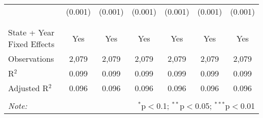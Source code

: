 \begin{table}[!htbp]
\begin{tabular}{@{\extracolsep{5pt}}lcccccc}
  & (0.001) & (0.001) & (0.001) & (0.001) & (0.001) & (0.001) \\ 
  & & & & & & \\ 
\hline \\[-1.8ex] 
State + Year Fixed Effects & Yes & Yes & Yes & Yes & Yes & Yes \\ 
Observations & 2,079 & 2,079 & 2,079 & 2,079 & 2,079 & 2,079 \\ 
R$^{2}$ & 0.099 & 0.099 & 0.099 & 0.099 & 0.099 & 0.099 \\ 
Adjusted R$^{2}$ & 0.096 & 0.096 & 0.096 & 0.096 & 0.096 & 0.096 \\ 
\hline 
\hline \\[-1.8ex] 
\textit{Note:}  & \multicolumn{6}{r}{$^{*}$p$<$0.1; $^{**}$p$<$0.05; $^{***}$p$<$0.01} \\ 
\end{tabular} 
\end{table} 

